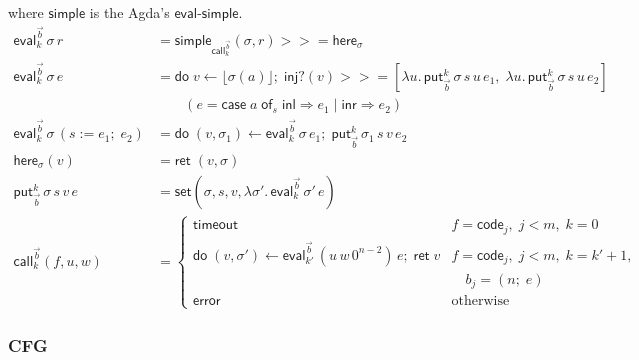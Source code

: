 \documentclass[10pt]{article}
\theoremstyle{acmplain}
\newcommand{\key}[1]{\mathsf{#1}}
\newcommand{\error}{\key{error}}
\newcommand{\codeV}[1]{\key{code}_{#1}}
\newcommand{\assign}[3]{#1 \mathrel{:=} #2;\; #3}
\newcommand{\Casei}[4]{\key{case}\;#1\;\key{of}_{#2}\;\key{inl} \Rightarrow #3 \mid \key{inr} \Rightarrow #4}
\newcommand{\tmo}{\key{timeout}}
\newcommand{\Ret}{\key{ret}\;}
\newcommand{\bind}{\mathbin{>\!\!>\!\!=}}
\newcommand{\Do}{\key{do}\;}
\newcommand{\lift}[1]{\lfloor #1 \rfloor}
\newcommand{\EV}[2]{\key{eval}^{#1}_{#2}}
\newcommand{\CALL}[2]{\key{call}^{#1}_{#2}}
\begin{document}
where $\key{simple}$ is the Agda's $\key{eval\text{-}simple}$.
\begin{align*}
  \EV{\vec{b}}{k}\,\sigma\,r &= \key{simple}_{\CALL{\vec{b}}{k}}(\sigma, r) \bind \key{here}_\sigma \\
  \EV{\vec{b}}{k}\,\sigma\,e &=
    \Do v \leftarrow \lift{\sigma(a)};\; \key{inj?}(v) \bind [\lambda u.\, \key{put}^k_{\vec{b}}\,\sigma\,s\,u\,e_1,\;
      \lambda u.\, \key{put}^k_{\vec{b}}\,\sigma\,s\,u\,e_2] \\
    &\qquad (e = \Casei{a}{s}{e_1}{e_2}) \\
  \EV{\vec{b}}{k}\,\sigma\,(\assign{s}{e_1}{e_2}) &=
    \Do (v, \sigma_1) \leftarrow \EV{\vec{b}}{k}\,\sigma\,e_1;\; \key{put}^k_{\vec{b}}\,\sigma_1\,s\,v\,e_2 \\[1ex]
  \key{here}_\sigma(v) &= \Ret (v, \sigma) \\
  \key{put}^k_{\vec{b}}\,\sigma\,s\,v\,e &= \key{set}(\sigma, s, v, \lambda \sigma'.\, \EV{\vec{b}}{k}\,\sigma'\,e) \\
  \CALL{\vec{b}}{k}(f, u, w) &=
    \begin{cases}
      \tmo & f = \codeV{j},\; j < m,\; k = 0 \\
      \Do (v, \sigma') \leftarrow \EV{\vec{b}}{k'}\,(u\, w\, 0^{n-2})\,e;\; \Ret v
        & f = \codeV{j},\; j < m,\; k = k' + 1, \\
        & \quad b_j = (n;\; e) \\
      \error & \text{otherwise}
    \end{cases}
\end{align*}

\subsubsection{CFG}
\end{document}
